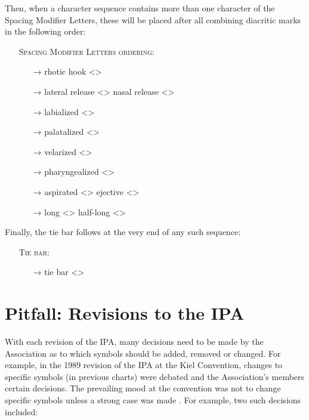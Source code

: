 \noindent Then, when a character sequence contains more than one character of the Spacing
Modifier Letters, these will be placed after all combining diacritic marks in the
following order:

\begin{itemize}
	\item[] \textsc{Spacing Modifier Letters ordering:}
	\begin{itemize}
	  \item[→] rhotic hook <>
	  \item[→] lateral release <> \textbar{} nasal release <>
	  \item[→] labialized <>
	  \item[→] palatalized <>
	  \item[→] velarized <>
	  \item[→] pharyngealized <>
	  \item[→] aspirated <> \textbar{} ejective <>
	  \item[→] long <> \textbar{} half-long <>
	\end{itemize}
\end{itemize}

\noindent Finally, the tie bar follows at the very end of any such sequence:

\begin{itemize}
  \item[] \textsc{Tie bar:}
  \begin{itemize}
    \item[→] tie bar <>
  \end{itemize}
\end{itemize}

\section{Pitfall: Revisions to the IPA}
\label{ipa-revisions}

With each revision of the IPA, many decisions need to be made by 
the Association as to which symbols should be added, removed or 
changed. For example, in the 1989 revision of the IPA at the Kiel Convention, 
changes to specific symbols (in previous charts) were debated and 
the Association's members certain decisions. The prevailing mood at 
the convention was not to change specific symbols unless a strong 
case was made \citep{Ladefoged1990a}. For example, two such decisions 
included:

